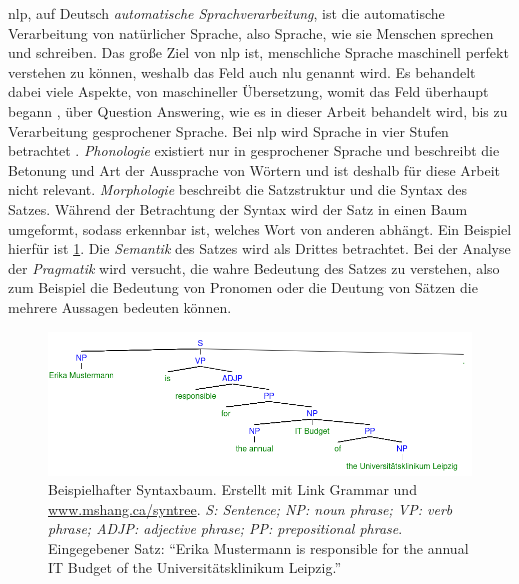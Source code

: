 \acf{nlp}, auf Deutsch \emph{automatische Sprachverarbeitung}, ist die automatische Verarbeitung von natürlicher Sprache, also Sprache, wie sie Menschen sprechen und schreiben.
Das große Ziel von \ac{nlp} ist, menschliche Sprache maschinell perfekt verstehen zu können, weshalb das Feld auch \ac{nlu} genannt wird.
Es behandelt dabei viele Aspekte, von maschineller Übersetzung, womit das Feld überhaupt begann \citep{nlphistory}, über Question Answering,
wie es in dieser Arbeit behandelt wird, bis zu Verarbeitung gesprochener Sprache.
Bei \ac{nlp} wird Sprache in vier Stufen betrachtet \citep{nlpreviewtts}.
\emph{Phonologie} existiert nur in gesprochener Sprache und beschreibt die Betonung und Art der Aussprache von Wörtern und ist deshalb für diese Arbeit nicht relevant.
\emph{Morphologie} beschreibt die Satzstruktur und die Syntax des Satzes.
Während der Betrachtung der Syntax wird der Satz in einen Baum umgeformt, sodass erkennbar ist, welches Wort von anderen abhängt.
Ein Beispiel hierfür ist \cref{fig:syntaxtree}.
Die \emph{Semantik} des Satzes wird als Drittes betrachtet.
Bei der Analyse der \emph{Pragmatik} wird versucht, die wahre Bedeutung des Satzes zu verstehen, also zum Beispiel die Bedeutung von Pronomen oder die Deutung von Sätzen die mehrere Aussagen bedeuten können.
\begin{figure}%
\centering
\includegraphics[width=\textwidth, height=\textheight, keepaspectratio]{Images/syntaxtree.png}
\caption[Beispielhafter Syntaxbaum]{Beispielhafter Syntaxbaum. Erstellt mit Link Grammar \citep{grammarparser} und \url{www.mshang.ca/syntree}.
\emph{S: Sentence; NP: noun phrase; VP: verb phrase; ADJP: adjective phrase; PP: prepositional phrase}.
Eingegebener Satz: \enquote{Erika Mustermann is responsible for the annual IT Budget of the Universitätsklinikum Leipzig.}}
\label{fig:syntaxtree}
\end{figure}

